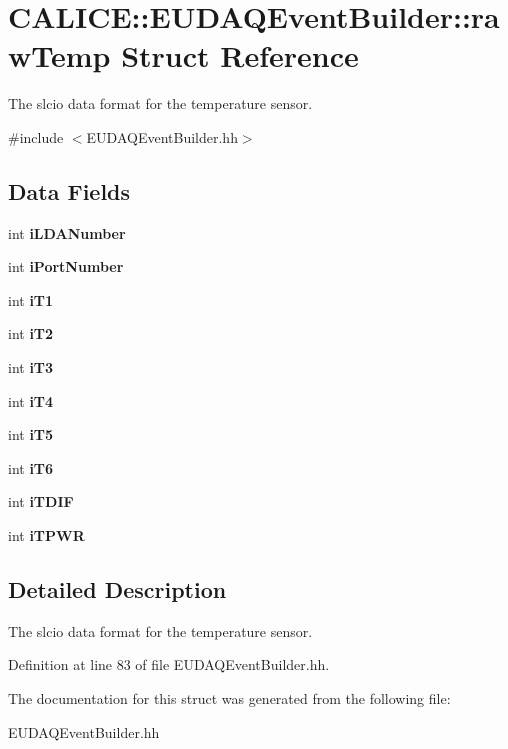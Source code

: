 \section{CALICE::EUDAQEventBuilder::rawTemp Struct Reference}
\label{structCALICE_1_1EUDAQEventBuilder_1_1rawTemp}


The slcio data format for the temperature sensor.  


{\ttfamily \#include $<$EUDAQEventBuilder.hh$>$}\subsection*{Data Fields}
\begin{DoxyCompactItemize}
\item 
int {\bfseries iLDANumber}\label{structCALICE_1_1EUDAQEventBuilder_1_1rawTemp_a09d0088a0bff17680af4d362a2f3d68b}

\item 
int {\bfseries iPortNumber}\label{structCALICE_1_1EUDAQEventBuilder_1_1rawTemp_ab3401099946c3a264e7a751dd838130c}

\item 
int {\bfseries iT1}\label{structCALICE_1_1EUDAQEventBuilder_1_1rawTemp_aeec77818c34b8a38dd955f352aad2ae3}

\item 
int {\bfseries iT2}\label{structCALICE_1_1EUDAQEventBuilder_1_1rawTemp_a0bdd1967940c9dbc2dcc55d888744ddb}

\item 
int {\bfseries iT3}\label{structCALICE_1_1EUDAQEventBuilder_1_1rawTemp_a639325966d678f86bbb316d43b32552a}

\item 
int {\bfseries iT4}\label{structCALICE_1_1EUDAQEventBuilder_1_1rawTemp_a74fd7f7987c580a6c08399f67f4cc50e}

\item 
int {\bfseries iT5}\label{structCALICE_1_1EUDAQEventBuilder_1_1rawTemp_a924de3c43a94649f9653e31ae17ff521}

\item 
int {\bfseries iT6}\label{structCALICE_1_1EUDAQEventBuilder_1_1rawTemp_acd61e0a8d4b8a1a7fa543f52685c95ce}

\item 
int {\bfseries iTDIF}\label{structCALICE_1_1EUDAQEventBuilder_1_1rawTemp_a04f59d0177aa2f4e9c4b423629a2793b}

\item 
int {\bfseries iTPWR}\label{structCALICE_1_1EUDAQEventBuilder_1_1rawTemp_ac56f6bbacdec1a4394317d45cc60e237}

\end{DoxyCompactItemize}


\subsection{Detailed Description}
The slcio data format for the temperature sensor. 

Definition at line 83 of file EUDAQEventBuilder.hh.

The documentation for this struct was generated from the following file:\begin{DoxyCompactItemize}
\item 
EUDAQEventBuilder.hh\end{DoxyCompactItemize}
